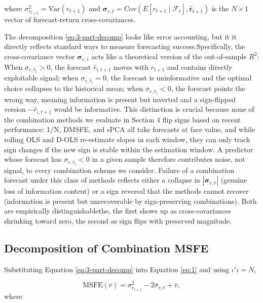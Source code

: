 \documentclass[a4paper,11pt]{article}
\begin{document}
where $\sigma_{r_{t+1}}^2 = \mathrm{Var}(r_{t+1})$ and $\boldsymbol{\sigma}_{r, \hat{r}} = \mathrm{Cov}(E[r_{t+1} \mid \mathcal{F}_t], \hat{\mathbf{r}}_{t+1})$ is the $N \times 1$ vector of forecast-return cross-covariances.

The decomposition \eqref{eq:3-part-decomp} looks like error accounting, but it it directly reflects standard ways to measure forecasting success.Specifically, the cross-covariance vector $\boldsymbol{\sigma}_{r,\hat{r}}$ acts like a theoretical version of the out-of-sample $R^2$: When $\sigma_{r,\hat{r}_i} > 0$, the forecast $\hat{r}_{i,t+1}$ moves with $r_{t+1}$ and contains directly exploitable signal; when $\sigma_{r,\hat{r}_i} = 0$, the forecast is uninformative and the optimal choice collapses to the historical mean; when $\sigma_{r,\hat{r}_i} < 0$, the forecast points the wrong way, meaning information is present but inverted and a sign-flipped version $-\hat{r}_{i,t+1}$ would be informative.
This distinction is crucial because none of the combination methods we evaluate in Section 4 flip signs based on recent performance: 1/N, DMSFE, and sPCA all take forecasts at face value, and while rolling OLS and D-OLS re-estimate slopes in each window, they can only track sign changes if the new sign is stable within the estimation window. A predictor whose forecast has $\sigma_{r,\hat{r}_i} < 0$ in a given sample therefore contributes noise, not signal, to every combination scheme we consider. Failure of a combination forecast under this class of methods reflects either a collapse in $|\boldsymbol{\sigma}_{r,\hat{r}}|$ (genuine loss of information content) or a sign reversal that the methods cannot recover (information is present but unrecoverable by sign-preserving combinations). Both are empirically distinguishablethe, the first shows up as cross-covariances shrinking toward zero, the second as sign flips with preserved magnitude.

\subsection{Decomposition of Combination MSFE}

\noindent Substituting Equation \ref{eq:3-part-decomp} into Equation \ref{eq:1} and using $\iota'\iota = N$, 

\begin{equation}
    \mathrm{MSFE}(\bar{r}) = \sigma_{r_{t+1}}^2 - 2\bar{\sigma}_{r,\hat{r}} + \bar{v},
\end{equation}
\noindent where
\end{document}
